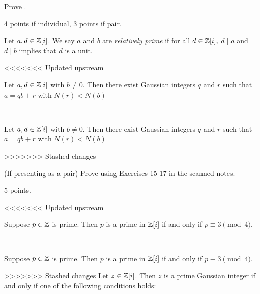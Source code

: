 \documentclass[letterpaper, 11 pt,handout]{ximera}
\begin{document}
\begin{exploration}
\begin{problem}
Prove .
	\begin{rubric}
 		4 points if individual, 3 points if pair.
	\end{rubric}
\end{problem}



\begin{definition}
 Let $a,d\in\mathbb Z[i]$. We say $a$ and $b$ are \emph{relatively prime} if for all $d\in\mathbb Z[i],$ $d\mid a$ and $d\mid b$ implies that $d$ is a unit.
\end{definition}

<<<<<<< Updated upstream
\begin{thm*}\label{div-gauss-int}
 Let $a,d\in\mathbb Z[i]$ with $b\neq 0$. Then there exist Gaussian integers $q$ and $r$ such that $a=qb+r$ with $N(r)<N(b)$
\end{thm*}
=======
\begin{theorem}\label{div-gauss-int}
 Let $a,d\in\mathbb Z[i]$ with $b\neq 0$. Then there exist Gaussian integers $q$ and $r$ such that $a=qb+r$ with $N(r)<N(b)$
\end{theorem}
>>>>>>> Stashed changes

\begin{problem}(If presenting as a pair)
Prove  using Exercises 15-17 in the scanned notes.
	\begin{rubric}
 		5 points.
	\end{rubric}
\end{problem}

<<<<<<< Updated upstream
\begin{thm*}[Theorem 13.5.4]
 Suppose $p\in\mathbb Z$ is prime. Then $p$ is a prime in $\mathbb Z[i]$ if and only if $p\equiv 3\pmod{4}$.
\end{thm*}



\begin{thm*}[Theorem 13.5.5]\label{thm:guass-primes}
=======
\begin{theorem}[Theorem 13.5.4]
 Suppose $p\in\mathbb Z$ is prime. Then $p$ is a prime in $\mathbb Z[i]$ if and only if $p\equiv 3\pmod{4}$.
\end{theorem}



\begin{theorem}[Theorem 13.5.5]\label{thm:guass-primes}
>>>>>>> Stashed changes
 Let $z\in\mathbb Z[i]$. Then $z$ is a prime Gaussian integer if and only if one of the following conditions holds:
 

\end{theorem}
\end{thm*}
\end{exploration}
\end{document}

